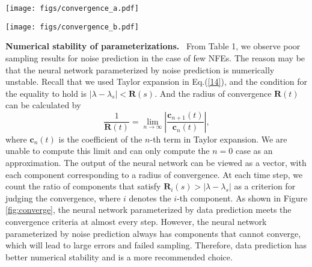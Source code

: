 \begin{figure*}[ht]
    \centering
    \begin{minipage}[t]{0.45\linewidth}
        \centering
        \texttt{[image: figs/convergence\_a.pdf]} %
        \label{fig:convergence(a)}
    \end{minipage}
    \begin{minipage}[t]{0.43\linewidth}
        \centering
        \texttt{[image: figs/convergence\_b.pdf]} %
        \label{fig:convergence(b)}
    \end{minipage}
    \caption{\textbf{Convergence of noise prediction and data prediction.} In (a), we choose a low-light image for example. The numbers in parentheses indicate the NFE. In (b), we illustrate the ratio of components of neural network output that satisfy the Taylor expansion convergence requirement.}
    \label{fig:converge}
\end{figure*}

\textbf{Numerical stability of parameterizations.}~ From Table 1, we observe poor sampling results for noise prediction in the case of few NFEs. The reason may be that the neural network parameterized by noise prediction is numerically unstable. Recall that we used Taylor expansion in Eq.(\ref{14}), and the condition for the equality to hold is $|\lambda-\lambda_s|<\boldsymbol{R}(s)$. And the radius of convergence $\boldsymbol{R}(t)$ can be calculated by
\begin{equation}
\frac{1}{\boldsymbol{R}(t)}=\lim_{n\rightarrow\infty}\left|\frac{\boldsymbol{c}_{n+1}(t)}{\boldsymbol{c}_n(t)}\right|,
\end{equation}
where $\boldsymbol{c}_n(t)$ is the coefficient of the $n$-th term in Taylor expansion. We are unable to compute this limit and can only compute the $n=0$ case as an approximation. The output of the neural network can be viewed as a vector, with each component corresponding to a radius of convergence. At each time step, we count the ratio of components that satisfy $\boldsymbol{R}_i(s)>|\lambda-\lambda_s|$ as a criterion for judging the convergence, where $i$ denotes the $i$-th component. As shown in Figure \ref{fig:converge}, the neural network parameterized by data prediction meets the convergence criteria at almost every step. However, the neural network parameterized by noise prediction always has components that cannot converge, which will lead to large errors and failed sampling. Therefore, data prediction has better numerical stability and is a more recommended choice.

